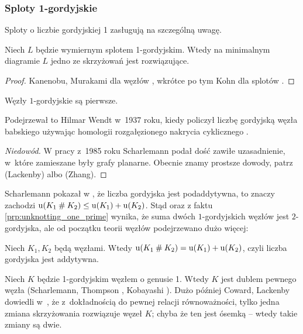 
\subsubsection{Sploty 1-gordyjskie}
Sploty o liczbie gordyjskiej 1 zasługują na szczególną uwagę.

\begin{proposition}
%
    Niech $L$ będzie wymiernym splotem 1-gordyjskim.
    Wtedy na minimalnym diagramie $L$ jedno ze skrzyżowań jest rozwiązujące.
\end{proposition}

\begin{proof}
%
%
%
    Kanenobu, Murakami dla węzłów \cite{kanenobumurakami86}, wkrótce po tym Kohn dla splotów \cite{kohn91}.
\end{proof}

\begin{proposition}
\label{prp:unknotting_one_prime}%
    Węzły $1$-gordyjskie są pierwsze.
\end{proposition}

Podejrzewał to Hilmar Wendt w~1937 roku, kiedy policzył liczbę gordyjską węzła babskiego używając homologii rozgałęzionego nakrycia cyklicznego \cite{wendt37}.
%

\begin{proof}[Niedowód]
%
%
%
    W pracy \cite{scharlemann85} z~1985 roku Scharlemann podał dość zawiłe uzasadnienie, w~które zamieszane były grafy planarne.
    Obecnie znamy prostsze dowody, patrz \cite{lackenby97} (Lackenby) albo \cite{zhang91} (Zhang).
\end{proof}

Scharlemann pokazał w \cite[wniosek 1.6]{scharlemann98}, że liczba gordyjska jest podaddytywna, to znaczy zachodzi $\operatorname{u}(K_1 \mathbin{\#} K_2) \le \operatorname{u}(K_1) + \operatorname{u}(K_2)$.
Stąd oraz z faktu \ref{prp:unknotting_one_prime} wynika, że suma dwóch $1$-gordyjskich węzłów jest $2$-gordyjska, ale od początku teorii węzłów podejrzewano dużo więcej:

\begin{conjecture}
%
    Niech $K_1, K_2$ będą węzłami.
    Wtedy $\operatorname{u} (K_1 \mathbin{\#} K_2) = \operatorname{u}(K_1) + \operatorname{u}(K_2)$, czyli liczba gordyjska jest addytywna.
\end{conjecture}

Niech $K$ będzie 1-gordyjskim węzłem o genusie 1.
Wtedy $K$ jest dublem pewnego węzła (Scharlemann, Thompson \cite{thompson88}, Kobayashi \cite{kobayashitsuyoshi89}).
%
%
%
Dużo później Coward, Lackenby dowiedli w~\cite{coward11}, że z~dokładnością do pewnej relacji równoważności, tylko jedna zmiana skrzyżowania rozwiązuje węzeł $K$; chyba że ten jest ósemką -- wtedy takie zmiany są dwie.
%
%
